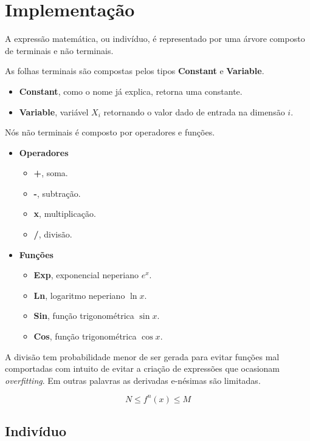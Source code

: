 \section{Implementação}

A expressão matemática, ou indivíduo, é representado por uma árvore composto de terminais e não terminais.

As folhas terminais são compostas pelos tipos \textbf{Constant} e \textbf{Variable}.

\begin{itemize}
	\item \textbf{Constant}, como o nome já explica, retorna uma constante.
	\item \textbf{Variable}, variável $X_i$ retornando o valor dado de entrada na dimensão $i$.
\end{itemize}

Nós não terminais é composto por operadores e funções.

\begin{itemize}
	\item \textbf{Operadores}
	\begin{itemize}
		\item \textbf{+}, soma.
		\item \textbf{-}, subtração.
		\item \textbf{x}, multiplicação.
		\item \textbf{/}, divisão.
	\end{itemize}
	\item \textbf{Funções}
	\begin{itemize}
		\item \textbf{Exp}, exponencial neperiano $e^x$.
		\item \textbf{Ln}, logaritmo neperiano $\ln x$.
		\item \textbf{Sin}, função trigonométrica $\sin x$.
		\item \textbf{Cos}, função trigonométrica $\cos x$.
	\end{itemize}
\end{itemize}

A divisão tem probabilidade menor de ser gerada para evitar funções mal comportadas com intuito de evitar a criação de expressões que ocasionam \textit{overfitting}. Em outras palavras as derivadas e-nésimas são limitadas.

\[N \le f^n(x) \le M\]

\subsection{Indivíduo}

